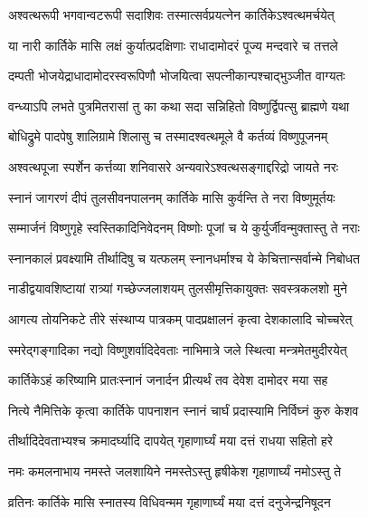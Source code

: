 \twolineshloka
{अश्वत्थरूपी भगवान्वटरूपी सदाशिवः}
{तस्मात्सर्वप्रयत्नेन कार्तिकेऽश्वत्थमर्चयेत्} %

\twolineshloka
{या नारी कार्तिके मासि लक्षं कुर्यात्प्रदक्षिणाः}
{राधादामोदरं पूज्य मन्दवारे च तत्तले} %

\twolineshloka
{दम्पती भोजयेद्राधादामोदरस्वरूपिणौ}
{भोजयित्वा सपत्नीकान्पश्चाद्भुञ्जीत वाग्यतः} %

\twolineshloka
{वन्ध्याऽपि लभते पुत्रमितरासां तु का कथा}
{सदा सन्निहितो विष्णुर्द्विपत्सु ब्राह्मणे यथा} %

\twolineshloka
{बोधिद्रुमे पादपेषु शालिग्रामे शिलासु च}
{तस्मादश्वत्थमूले वै कर्तव्यं विष्णुपूजनम्} %

\twolineshloka
{अश्वत्थपूजा स्पर्शेन कर्त्तव्या शनिवासरे}
{अन्यवारेऽश्वत्थसङ्गाद्दरिद्रो जायते नरः} %

\twolineshloka
{स्नानं जागरणं दीपं तुलसीवनपालनम्}
{कार्तिके मासि कुर्वन्ति ते नरा विष्णुमूर्तयः} %

\twolineshloka
{सम्मार्जनं विष्णुगृहे स्वस्तिकादिनिवेदनम्}
{विष्णोः पूजां च ये कुर्युर्जीवन्मुक्तास्तु ते नराः} %

\twolineshloka
{स्नानकालं प्रवक्ष्यामि तीर्थादिषु च यत्फलम्}
{स्नानधर्माश्च ये केचित्तान्सर्वान्मे निबोधत} %






\twolineshloka
{नाडीद्वयावशिष्टायां रात्र्यां गच्छेज्जलाशयम्}
{तुलसीमृत्तिकायुक्तः सवस्त्रकलशो मुने} %

\twolineshloka
{आगत्य तोयनिकटे तीरे संस्थाप्य पात्रकम्}
{पादप्रक्षालनं कृत्वा देशकालादि चोच्चरेत्} %

\twolineshloka
{स्मरेद्गङ्गादिका नद्यो विष्णुशर्वादिदेवताः}
{नाभिमात्रे जले स्थित्वा मन्त्रमेतमुदीरयेत्} %

\twolineshloka
{कार्तिकेऽहं करिष्यामि प्रातःस्नानं जनार्दन}
{प्रीत्यर्थं तव देवेश दामोदर मया सह} %

\twolineshloka
{नित्ये नैमित्तिके कृत्वा कार्तिके पापनाशन}
{स्नानं चार्घं प्रदास्यामि निर्विघ्नं कुरु केशव} %

\twolineshloka
{तीर्थादिदेवताभ्यश्च क्रमादर्घ्यादि दापयेत्}
{गृहाणार्घ्यं मया दत्तं राधया सहितो हरे} %

\twolineshloka
{नमः कमलनाभाय नमस्ते जलशायिने}
{नमस्तेऽस्तु हृषीकेश गृहाणार्घ्यं नमोऽस्तु ते} %

\twolineshloka
{व्रतिनः कार्तिके मासि स्नातस्य विधिवन्मम}
{गृहाणार्घ्यं मया दत्तं दनुजेन्द्रनिषूदन} %

